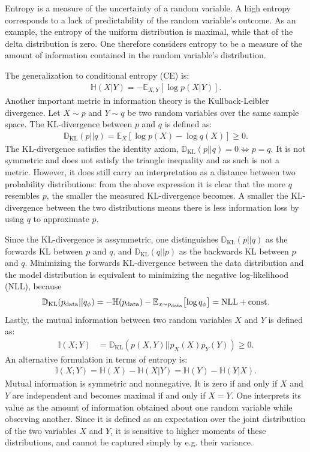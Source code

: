 Entropy is a measure of the uncertainty of a random variable. A high entropy corresponds to a lack of predictability of the random variable's outcome. As an example, the entropy of the uniform distribution is maximal, while that of the delta distribution is zero. One therefore considers entropy to be a measure of the amount of information contained in the random variable's distribution.

The generalization to conditional entropy (CE) is:
\begin{align}
    \mathbb{H}(X|Y) =  -\mathbb{E}_{X, Y} \left[ \log p(X|Y) \right].
\end{align} 
Another important metric in information theory is the Kullback-Leibler divergence. Let $X \sim p$ and $Y \sim q$ be two random variables over the same sample space. The KL-divergence between $p$ and $q$ is defined as:
\begin{align}
\mathbb{D}_{\text{KL}}(p || q) = \mathbb{E}_{X} \left[ \log p(X) - \log q(X) \right] \geq 0.
\end{align}
The KL-divergence satisfies the identity axiom, $\mathbb{D}_{\text{KL}}(p || q) = 0 \Leftrightarrow p = q$. It is not symmetric and does not satisfy the triangle inequality and as such is not a metric. However, it does still carry an interpretation as a distance between two probability distributions: from the above expression it is clear that the more $q$ resembles $p$, the smaller the measured KL-divergence becomes. A smaller the KL-divergence between the two distributions means there is less information loss by using  $q$ to approximate $p$.

Since the KL-divergence is assymmetric, one distinguishes $\mathbb{D}_{\text{KL}}(p || q)$ as the forwards KL between $p$ and $q$, and $\mathbb{D}_{\text{KL}}(q || p)$ as the backwards KL between $p$ and $q$. Minimizing the forwards KL-divergence between the data distribution and the model distribution is equivalent to minimizing the negative log-likelihood (NLL), because
\begin{align}
    \mathbb{D}_{\text{KL}}(p_{\text{data}} || q_\phi) = 
    -\mathbb{H}(p_{\text{data}}) - \mathbb{E}_{x \sim p_{\text{data}}} 
    \bigl[ \log q_\phi \bigr] = \text{NLL} + \text{const}.
\end{align}
Lastly, the mutual information between two random variables $X$ and $Y$ is defined as:
\begin{align}
\mathbb{I}(X; Y)
         &= \mathbb{D}_{\text{KL}}(p(X, Y) || p_X(X) p_Y(Y)) \geq 0.
\end{align}
An alternative formulation in terms of entropy is:
\begin{align}
    \mathbb{I}(X; Y) = \mathbb{H}(X) - \mathbb{H}(X | Y) 
    = \mathbb{H}(Y) - \mathbb{H}(Y | X).
\end{align}
Mutual information is symmetric and nonnegative. It is zero if and only if $X$ and $Y$ are independent and becomes maximal if and only if $X = Y$. One interprets its value as the amount of information obtained about one random variable while observing another. Since it is defined as an expectation over the joint distribution of the two variables $X$ and $Y$, it is sensitive to higher moments of these distributions, and cannot be captured simply by e.g. their variance.

